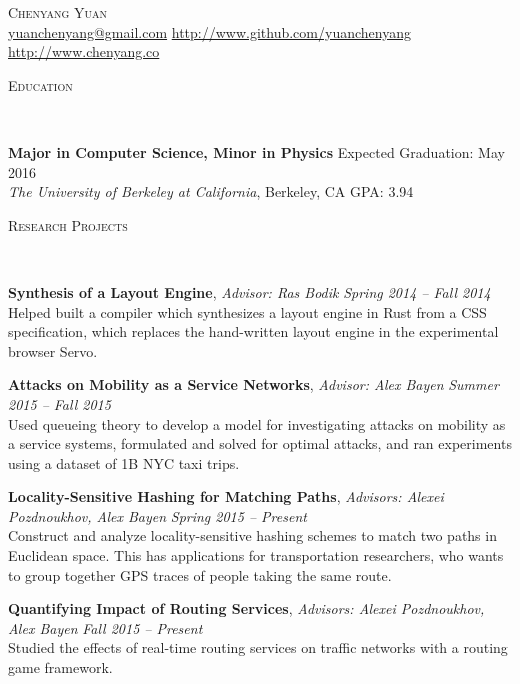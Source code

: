 \documentclass[9pt]{article}
\newenvironment{changemargin}[2]{%
  \begin{list}{}{%
      \setlength{\topsep}{0pt}%
      \setlength{\leftmargin}{#1}%
      \setlength{\rightmargin}{#2}%
      \setlength{\listparindent}{\parindent}%
      \setlength{\itemindent}{\parindent}%
      \setlength{\parsep}{\parskip}%
    }%
  \item[]}{\end{list}
}
\newcommand{\lineover}{
  \begin{changemargin}{-0.05in}{-0.05in}
    \vspace*{-8pt}
    \hrulefill \\
    \vspace*{-2pt}
  \end{changemargin}
}
\newcommand{\header}[1]{
  \begin{changemargin}{-0.5in}{-0.5in}
    \scshape{#1}\\
    \lineover
  \end{changemargin}
}
\newcommand{\contact}[2]{
  \begin{changemargin}{-0.5in}{-0.5in}
    \begin{center}
      {\Large \scshape {#1}}\\ \smallskip
      {#2}\\ \smallskip
    \end{center}
  \end{changemargin}
}
\newenvironment{body} {
  \vspace*{-16pt}
  \begin{changemargin}{-0.25in}{-0.5in}
  }
  {\end{changemargin}
}
\begin{document}
\contact{Chenyang Yuan}{\url{yuanchenyang@gmail.com}  \quad \url{http://www.github.com/yuanchenyang} \quad \url{http://www.chenyang.co}}

\header{Education}

\begin{body}
  \vspace{14pt}
  \textbf{Major in Computer Science, Minor in Physics} \hfill Expected Graduation: May 2016 \\
  \emph{The University of Berkeley at California}, Berkeley, CA{} \hfill GPA: 3.94 \\
\end{body}

\smallskip

\header{Research Projects}

\begin{body}
  \vspace{14pt}

  \textbf{Synthesis of a Layout Engine}, \emph{Advisor: Ras Bodik} \hfill \emph{Spring 2014 -- Fall 2014}\\
  Helped built a compiler which synthesizes a layout engine in Rust from a CSS
  specification, which replaces the hand-written layout engine in the
  experimental browser Servo.

  \textbf{Attacks on Mobility as a Service Networks}, \emph{Advisor: Alex Bayen} \hfill \emph{Summer 2015 -- Fall 2015}\\
  Used queueing theory to develop a model for investigating attacks on mobility
  as a service systems, formulated and solved for optimal attacks, and ran
  experiments using a dataset of 1B NYC taxi trips.

  \textbf{Locality-Sensitive Hashing for Matching Paths}, \emph{Advisors: Alexei Pozdnoukhov, Alex Bayen} \hfill \emph{Spring 2015 -- Present}\\
  Construct and analyze locality-sensitive hashing schemes to match two paths in
  Euclidean space. This has applications for transportation researchers, who
  wants to group together GPS traces of people taking the same route.

  \textbf{Quantifying Impact of Routing Services}, \emph{Advisors: Alexei Pozdnoukhov, Alex Bayen} \hfill \emph{Fall 2015 -- Present}\\
  Studied the effects of real-time routing services on traffic networks with a routing
  game framework.

\end{body}
\end{document}
